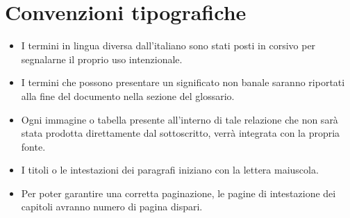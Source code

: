 \section*{Convenzioni tipografiche}
\begin{itemize}
	\item{I termini in lingua diversa dall'italiano sono stati posti in corsivo per segnalarne il proprio uso intenzionale.}
	\item { I termini che possono presentare un significato non banale saranno riportati alla fine del documento nella sezione del glossario.}
	\item {Ogni immagine o tabella presente all'interno di tale relazione che non sarà stata prodotta direttamente dal sottoscritto, verrà integrata con la propria fonte.}
	\item {I titoli o le intestazioni dei paragrafi iniziano con la lettera maiuscola.}
	\item {Per poter garantire una corretta paginazione, le pagine di intestazione dei capitoli avranno numero di pagina dispari.}
	
\end{itemize}

%
%

\endgroup			

\vfill

